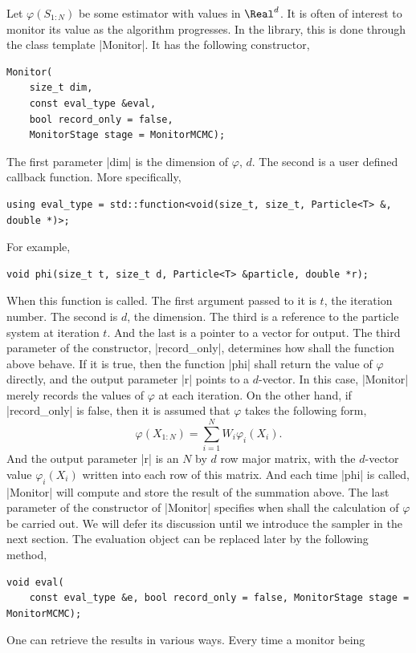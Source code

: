 Let $\varphi(S_{1:N})$ be some estimator with values in $\Real^d$. It is often
of interest to monitor its value as the algorithm progresses. In the library,
this is done through the class template |Monitor|. It has the following
constructor,
\begin{Verbatim}
Monitor(
    size_t dim,
    const eval_type &eval,
    bool record_only = false,
    MonitorStage stage = MonitorMCMC);
\end{Verbatim}
The first parameter |dim| is the dimension of $\varphi$, $d$. The second is a
user defined callback function. More specifically,
\begin{Verbatim}
using eval_type = std::function<void(size_t, size_t, Particle<T> &, double *)>;
\end{Verbatim}
For example,
\begin{Verbatim}
void phi(size_t t, size_t d, Particle<T> &particle, double *r);
\end{Verbatim}
When this function is called. The first argument passed to it is $t$, the
iteration number. The second is $d$, the dimension. The third is a reference to
the particle system at iteration $t$. And the last is a pointer to a vector for
output. The third parameter of the constructor, |record_only|, determines how
shall the function above behave. If it is true, then the function |phi| shall
return the value of $\varphi$ directly, and the output parameter |r| points to
a $d$-vector. In this case, |Monitor| merely records the values of $\varphi$ at
each iteration. On the other hand, if |record_only| is false, then it is
assumed that $\varphi$ takes the following form,
\begin{equation*}
  \varphi(X_{1:N}) = \sum_{i=1}^N W_i \varphi_i(X_i).
\end{equation*}
And the output parameter |r| is an $N$ by $d$ row major matrix, with the
$d$-vector value $\varphi_i(X_i)$ written into each row of this matrix. And
each time |phi| is called, |Monitor| will compute and store the result of the
summation above. The last parameter of the constructor of |Monitor| specifies
when shall the calculation of $\varphi$ be carried out. We will defer its
discussion until we introduce the sampler in the next section. The evaluation
object can be replaced later by the following method,
\begin{Verbatim}
void eval(
    const eval_type &e, bool record_only = false, MonitorStage stage = MonitorMCMC);
\end{Verbatim}
One can retrieve the results in various ways. Every time a monitor being
